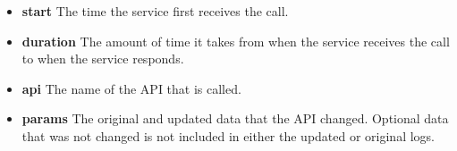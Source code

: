 \documentclass[12pt,a4paper]{article}
\begin{document}
\begin{itemize}
    \item \textbf{start} The time the service first receives the call.
    \item \textbf{duration} The amount of time it takes from when the service
        receives the call to when the service responds.
    \item \textbf{api} The name of the API that is called.
    \item \textbf{params} The original and updated data that the API changed.
        Optional data that was not changed is not included in either the
        updated or original logs.
\end{itemize}
\end{document}
